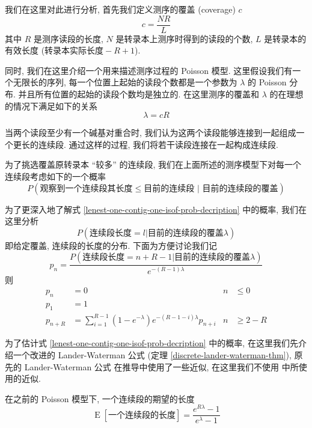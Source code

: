 我们在这里对此进行分析, 首先我们定义测序的覆盖 (coverage) $c$
\begin{equation}
c = \frac{NR}{L}
\end{equation}
其中 $R$ 是测序读段的长度, $N$ 是转录本上测序时得到的读段的个数, 
$L$ 是转录本的有效长度 ($\text{转录本实际长度} -R+1$). 

同时, 我们在这里介绍一个用来描述测序过程的 Poisson 模型. 
这里假设我们有一个无限长的序列, 
每一个位置上起始的读段个数都是一个参数为 $\lambda$ 的 Poisson 分布. 
并且所有位置的起始的读段个数均是独立的. 
在这里测序的覆盖和 $\lambda$ 的在理想的情况下满足如下的关系
\[
\lambda = c R
\]

当两个读段至少有一个碱基对重合时, 
我们认为这两个读段能够连接到一起组成一个更长的连续段. 通过这样的过程, 
我们将若干读段连接在一起构成连续段. 

为了挑选覆盖原转录本 ``较多'' 的连续段, 
我们在上面所述的测序模型下对每一个连续段考虑如下的一个概率
\begin{equation}
\label{lenest-one-contig-one-isof-prob-decription}
P(\text{观察到一个连续段其长度} \leq \text{目前的连续段 } |\text{ 目前的连续段的覆盖})
\end{equation}

为了更深入地了解式 \eqref{lenest-one-contig-one-isof-prob-decription} 中的概率, 
我们在这里分析
\begin{equation}
\label{lenest-one-cont-prob-distr}
P(\text{连续段长度} = l | \text{目前的连续段的覆盖} \lambda)
\end{equation}
即给定覆盖, 连续段的长度的分布. 
下面为方便讨论我们记
\begin{equation}
p_n =  \frac{P(\text{连续段长度} = n+R-1 | \text{目前的连续段的覆盖} \lambda)}{e^{-(R-1)\lambda}}
\end{equation}
则
\begin{align}
p_n &= 0 & n &\leq 0 \\
p_1 &= 1 & & \\
p_{n+R} &= \sum_{i=1}^{R-1} (1-e^{-\lambda}) e^{-(R-1-i)\lambda} p_{n+i} & n &\geq 2-R
\end{align}

为了估计式 \eqref{lenest-one-contig-one-isof-prob-decription} 中的概率, 
在这里我们先介绍一个改进的 Lander-Waterman 公式 (定理 \ref{discrete-lander-waterman-thm}), 
原先的 Lander-Waterman 公式 \cite{lander1988genomic} 在推导中使用了一些近似, 
在这里我们不使用  中所使用的近似. 

\begin{thm}
\label{discrete-lander-waterman-thm}
在之前的 Poisson 模型下, 一个连续段的期望的长度
\begin{equation}
\label{discrete-lander-waterman-formula}
\operatorname{E}[\text{一个连续段的长度}] = \frac{e^{R\lambda} - 1}{e^\lambda - 1} 
\end{equation}
\end{thm}

